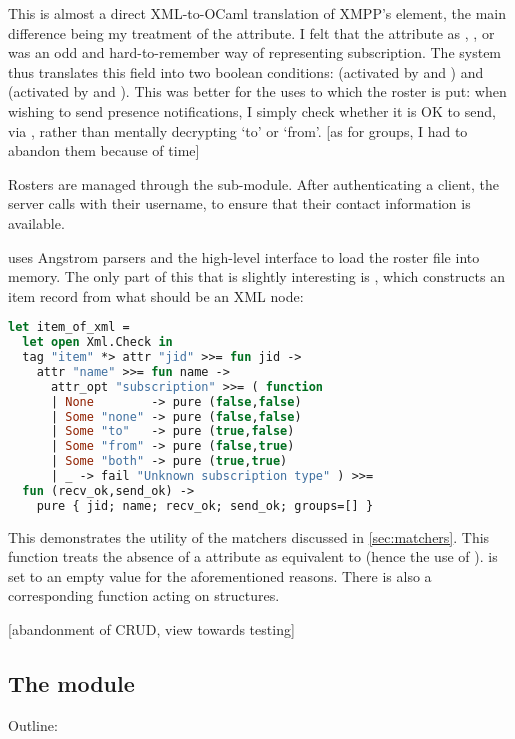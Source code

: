 \documentclass[12pt,a4paper,twoside,openright]{report}
\begin{document}
{This is almost a direct XML-to-OCaml translation of XMPP's  element, the main difference being my treatment of the  attribute. I felt that the  attribute as , ,  or  was an odd and hard-to-remember way of representing subscription. The system thus translates this field into two boolean conditions:  (activated by  and ) and  (activated by  and ). This was better for the uses to which the roster is put: when wishing to send presence notifications, I simply check whether it is OK to send, via , rather than mentally decrypting `to' or `from'. [as for groups, I had to abandon them because of time]

Rosters are managed through the  sub-module. After authenticating a client, the server calls  with their username, to ensure that their contact information is available.

 uses Angstrom parsers and the high-level  interface to load the roster file into memory. The only part of this that is slightly interesting is , which constructs an item record from what should be an  XML node:

\begin{lstlisting}[language=ml]
let item_of_xml =
  let open Xml.Check in
  tag "item" *> attr "jid" >>= fun jid ->
    attr "name" >>= fun name ->
      attr_opt "subscription" >>= ( function
      | None        -> pure (false,false)
      | Some "none" -> pure (false,false)
      | Some "to"   -> pure (true,false)
      | Some "from" -> pure (false,true)
      | Some "both" -> pure (true,true)
      | _ -> fail "Unknown subscription type" ) >>=
  fun (recv_ok,send_ok) ->
    pure { jid; name; recv_ok; send_ok; groups=[] }
\end{lstlisting}

This demonstrates the utility of the  matchers discussed in \ref{sec:matchers}. This function treats the absence of a  attribute as equivalent to  (hence the use of ).  is set to an empty value for the aforementioned reasons. There is also a corresponding  function acting on  structures.

[abandonment of CRUD, view towards testing]

\subsection{The  module}
Outline:

}
\end{document}
